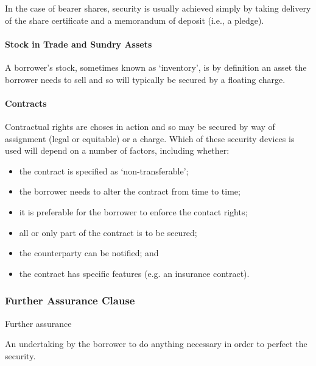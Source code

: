 \documentclass[
]{article}
\providecommand{\tightlist}{%
  \setlength{\itemsep}{0pt}\setlength{\parskip}{0pt}}
\newenvironment{env-8872a5c8-2356-4b38-87ff-b8a967f137b3}
{
    \savenotes\tcolorbox[blanker,breakable,left=5pt,borderline west={2pt}{-4pt}{yellow}]
}
{
    \endtcolorbox\spewnotes
}
\begin{document}
In the case of bearer shares, security is usually achieved simply by
taking delivery of the share certificate and a memorandum of deposit
(i.e., a pledge).

\hypertarget{stock-in-trade-and-sundry-assets}{%
\paragraph{Stock in Trade and Sundry
Assets}\label{stock-in-trade-and-sundry-assets}}

A borrower's stock, sometimes known as `inventory', is by definition an
asset the borrower needs to sell and so will typically be secured by a
floating charge.

\hypertarget{contracts}{%
\paragraph{Contracts}\label{contracts}}

Contractual rights are choses in action and so may be secured by way of
assignment (legal or equitable) or a charge. Which of these security
devices is used will depend on a number of factors, including whether:

\begin{itemize}
\tightlist
\item
  the contract is specified as `non-transferable';
\item
  the borrower needs to alter the contract from time to time;
\item
  it is preferable for the borrower to enforce the contact rights;
\item
  all or only part of the contract is to be secured;
\item
  the counterparty can be notified; and
\item
  the contract has specific features (e.g. an insurance contract).
\end{itemize}

\hypertarget{further-assurance-clause}{%
\subsubsection{Further Assurance
Clause}\label{further-assurance-clause}}

\begin{env-8872a5c8-2356-4b38-87ff-b8a967f137b3}

Further assurance

An undertaking by the borrower to do anything necessary in order to
perfect the security.

\end{env-8872a5c8-2356-4b38-87ff-b8a967f137b3}
\end{document}
